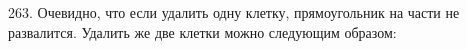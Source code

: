 263. Очевидно, что если удалить одну клетку, прямоугольник на части не развалится. Удалить же две клетки можно следующим образом:
\begin{center}
\begin{figure}[ht!]
\end{figure}
\end{center}
